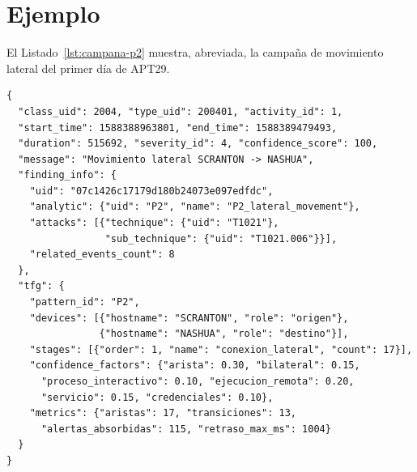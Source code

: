 \section{Ejemplo}

El Listado~\ref{lst:campana-p2} muestra, abreviada, la campaña de movimiento lateral del
primer día de APT29.

\begin{lstlisting}[caption={Campaña P2 de APT29, abreviada.},label={lst:campana-p2}]
{
  "class_uid": 2004, "type_uid": 200401, "activity_id": 1,
  "start_time": 1588388963801, "end_time": 1588389479493,
  "duration": 515692, "severity_id": 4, "confidence_score": 100,
  "message": "Movimiento lateral SCRANTON -> NASHUA",
  "finding_info": {
    "uid": "07c1426c17179d180b24073e097edfdc",
    "analytic": {"uid": "P2", "name": "P2_lateral_movement"},
    "attacks": [{"technique": {"uid": "T1021"},
                 "sub_technique": {"uid": "T1021.006"}}],
    "related_events_count": 8
  },
  "tfg": {
    "pattern_id": "P2",
    "devices": [{"hostname": "SCRANTON", "role": "origen"},
                {"hostname": "NASHUA", "role": "destino"}],
    "stages": [{"order": 1, "name": "conexion_lateral", "count": 17}],
    "confidence_factors": {"arista": 0.30, "bilateral": 0.15,
      "proceso_interactivo": 0.10, "ejecucion_remota": 0.20,
      "servicio": 0.15, "credenciales": 0.10},
    "metrics": {"aristas": 17, "transiciones": 13,
      "alertas_absorbidas": 115, "retraso_max_ms": 1004}
  }
}
\end{lstlisting}
